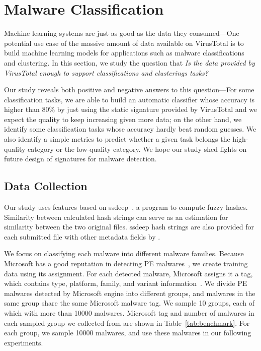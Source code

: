 \section{Malware Classification}
\label{sec:ssdeep}

Machine learning systems are just as good
as the data they consumed---One potential 
use case of the massive amount of data 
available on VirusTotal is to build 
machine learning models for applications
such as malware classifications and
clustering. In this section, we study
the question that {\em Is the data
provided by VirusTotal enough to support
classifications and clusterings tasks?}

Our study reveals both positive and
negative answers to this question---For
some classification tasks, we are able
to build an automatic classifier whose
accuracy is higher than 80\% by just
using the static signature provided by VirusTotal
and we expect the quality to keep increasing
given more data; on the other hand,
we identify some classification tasks
whose accuracy hardly beat random guesses.
We also identify a simple metrics
to predict whether a given task belongs
the high-quality category or the low-quality
category. We hope our study shed lights
on future design of signatures for malware
detection.



\subsection{Data Collection}



Our study uses features based on ssdeep~\cite{ssdeep}, a program to compute fuzzy hashes. 
Similarity between calculated hash strings can serve as an estimation for similarity between the two original files. 
ssdeep hash strings are also provided for each submitted file with other metadata fields by \vt. 

We focus on classifying each malware into
different malware families. Because Microsoft 
has a good reputation in detecting PE malwares~\cite{SongAPsys2016}, we create training
data using its assignment. For each detected malware, Microsoft assigns it a tag, which contains type, platform, family, and variant information~\cite{microsoft}. 
We divide PE malwares detected by Microsoft engine into different groups, and malwares in the same group share the same Microsoft malware tag. 
We sample 10 groups, each of which with more than 10000 malwares.  
Microsoft tag and number of malwares in each sampled group we collected from \vt{} are shown in Table~\ref{tab:benchmark}. 
For each group, we sample 10000 malwares, and use these malwares in our following experiments. 


